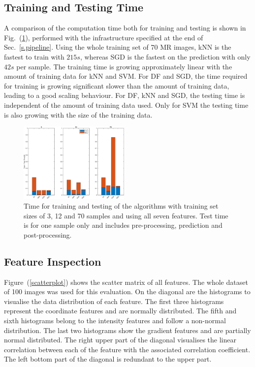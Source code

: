 \documentclass[journal]{IEEEtran}
\begin{document}
\subsection{Training and Testing Time}
A comparison of the computation time both for training and testing is shown in Fig.~(\ref{f.runtimebarplot}), performed with the infrastructure specified at the end of Sec.~\ref{s.pipeline}. Using the whole training set of 70 MR images, kNN is the fastest to train with $215s$, whereas SGD is the fastest on the prediction with only $42s$ per sample. The training time is growing approximately linear with the amount of training data for kNN and SVM. For DF and SGD, the time required for training is growing significant slower than the amount of training data, leading to a good scaling behaviour. For DF, kNN and SGD, the testing time is independent of the amount of training data used. Only for SVM the testing time is also growing with the size of the training data.
\vspace{-2mm}
\begin{figure}[h]
	\centering
	\includegraphics[width=0.48\textwidth]{images/runtimes}
	\caption{Time for training and testing of the algorithms with training set sizes of 3, 12 and 70 samples and using all seven features. Test time is for one sample only and includes pre-processing, prediction and post-processing.}\label{f.runtimebarplot}
\end{figure}
\vspace{-3mm}
\subsection{Feature Inspection}

Figure~(\ref{scatterplot}) shows the scatter matrix of all features. The whole dataset of 100 images was used for this evaluation. On the diagonal are the histograms to visualise the data distribution of each feature. The first three histograms represent the coordinate features and are normally distributed. The fifth and sixth histograms belong to the intensity features and follow a non-normal distribution. The last two histograms show the gradient features and are partially normal distributed. The right upper part of the diagonal visualises the linear correlation between each of the feature with the associated correlation coefficient. The left bottom part of the diagonal is redundant to the upper part. 
\end{document}
